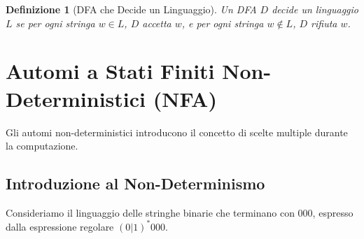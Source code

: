 \documentclass[a4paper, 11pt]{book} %
\newtheorem{definition}[theorem]{Definizione}
\theoremstyle{definition}
\begin{document}
\begin{definition}[DFA che Decide un Linguaggio]
Un DFA $D$ \emph{decide} un linguaggio $L$ se per ogni stringa $w \in L$, $D$ accetta $w$, e per ogni stringa $w \notin L$, $D$ rifiuta $w$.
\end{definition}

\section{Automi a Stati Finiti Non-Deterministici (NFA)}
Gli automi non-deterministici introducono il concetto di scelte multiple durante la computazione.

\subsection{Introduzione al Non-Determinismo}
Consideriamo il linguaggio delle stringhe binarie che terminano con $000$, espresso dalla espressione regolare $(0|1)^*000$.
\end{document}
